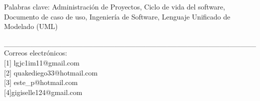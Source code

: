 \documentclass[12pt]{report}
\begin{document}
	\begin{small}
		Palabras clave: Administración de Proyectos, Ciclo de vida del software, Documento de caso de uso, Ingeniería de Software, Lenguaje Unificado de Modelado (UML)\\
	\end{small}
\begin{scriptsize}
    \_\_\_\_\_\_\_\_\_\_\_\_\_\_\_\_\_\_\_\_\_\_\_\_\_\_\_\_\_\_\_\_\_\_\_\_\_\_\_\_\_\_\_\_\_\_\_\_ \\
    Correos electrónicos:\\
	\hypertarget{x01}{[1]} lgjc1im11@gmail.com \\
	\hypertarget{x01}{[2]} quakediego33@hotmail.com \\  
	\hypertarget{x01}{[3]} este\_p@hotmail.com \\
 	\hypertarget{x01}{[4]}gigiselle124@gmail.com
\end{scriptsize}

\newpage
\end{document}
